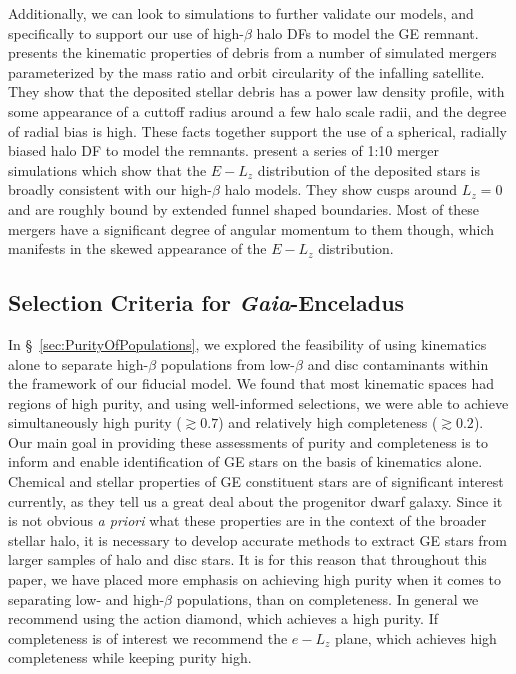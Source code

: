 Additionally, we can look to simulations to further validate our models, and specifically to support our use of high-$\beta$ halo DFs to model the GE remnant. \citet{amorisco17} presents the kinematic properties of debris from a number of simulated mergers parameterized by the mass ratio and orbit circularity of the infalling satellite. They show that the deposited stellar debris has a power law density profile, with some appearance of a cuttoff radius around a few halo scale radii, and the degree of radial bias is high. These facts together support the use of a spherical, radially biased halo DF to model the remnants. \citet{jean-baptiste17} present a series of 1:10 merger simulations which show that the $E-L_{z}$ distribution of the deposited stars is broadly consistent with our high-$\beta$ halo models. They show cusps around $L_{z}=0$ and are roughly bound by extended funnel shaped boundaries. Most of these mergers have a significant degree of angular momentum to them though, which manifests in the skewed appearance of the $E-L_{z}$ distribution.

\subsection{Selection Criteria for \textit{Gaia}-Enceladus}

In \S~\ref{sec:PurityOfPopulations}, we explored the feasibility of using kinematics alone to separate high-$\beta$ populations from low-$\beta$ and disc contaminants within the framework of our fiducial model. We found that most kinematic spaces had regions of high purity, and using well-informed selections, we were able to achieve simultaneously high purity ($\gtrsim 0.7$) and relatively high completeness ($\gtrsim 0.2$). Our main goal in providing these assessments of purity and completeness is to inform and enable identification of GE stars on the basis of kinematics alone. Chemical and stellar properties of GE constituent stars are of significant interest currently, as they tell us a great deal about the progenitor dwarf galaxy. Since it is not obvious \textit{a priori} what these properties are in the context of the broader stellar halo, it is necessary to develop accurate methods to extract GE stars from larger samples of halo and disc stars. It is for this reason that throughout this paper, we have placed more emphasis on achieving high purity when it comes to separating low- and high-$\beta$ populations, than on completeness. In general we recommend using the action diamond, which achieves a high purity. If completeness is of interest we recommend the $e-L_{z}$ plane, which achieves high completeness while keeping purity high.

